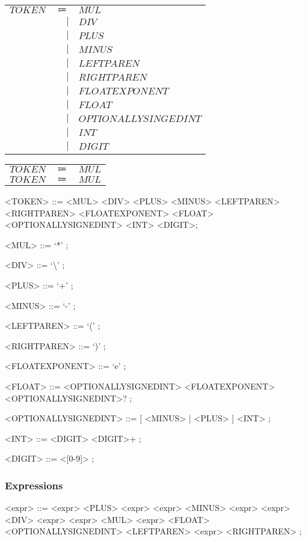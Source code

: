 \documentclass[a4paper,12pt]{article}
\begin{document}
{\setlength\tabcolsep{4pt}
\begin{tabular}{>{$}l<{$}>{$}r<{$}>{$}l<{$}}
  TOKEN &\Coloneqq &MUL\\%
  &| &DIV\\%
  &| &PLUS\\%
  &| &MINUS\\%
  &| &LEFTPAREN\\%
  &| &RIGHTPAREN\\%
  &| &FLOATEXPONENT\\%
  &| &FLOAT\\%
  &| &OPTIONALLYSINGEDINT\\%
  &| &INT\\%
  &| &DIGIT\\%
\end{tabular}}
\begin{grammar}

{\setlength\tabcolsep{4pt}
\begin{tabular}{>{$}l<{$}>{$}r<{$}>{$}l<{$}}
  TOKEN &\Coloneqq &MUL\\%
  TOKEN &\Coloneqq &MUL\\%
\end{tabular}}
<TOKEN> ::= <MUL> <DIV> <PLUS> <MINUS> <LEFTPAREN> <RIGHTPAREN> <FLOATEXPONENT> <FLOAT> <OPTIONALLYSIGNEDINT> <INT> <DIGIT>;

<MUL> ::= `*' ;

<DIV> ::= `\textbackslash' ;

<PLUS> ::= `+' ;

<MINUS> ::= `-' ;

<LEFTPAREN> ::= `(' ;

<RIGHTPAREN> ::= `)' ;

<FLOATEXPONENT> ::= `e' ;

<FLOAT> ::= <OPTIONALLYSIGNEDINT> <FLOATEXPONENT> <OPTIONALLYSIGNEDINT>? ;

<OPTIONALLYSIGNEDINT> ::= [ <MINUS> | <PLUS> ] <INT> ;

<INT> ::= <DIGIT> <DIGIT>+ ;

<DIGIT> ::= <[0-9]> ;


\end{grammar}
\subsubsection{Expressions}

\begin{grammar}
<expr> ::= <expr> <PLUS> <expr> 
 \alt <expr> <MINUS> <expr> 
 \alt <expr> <DIV> <expr> 
 \alt <expr> <MUL> <expr> 
 \alt <FLOAT> 
 \alt <OPTIONALLYSIGNEDINT> 
 \alt <LEFTPAREN> <expr> <RIGHTPAREN> ;
 

\end{grammar}
\end{document}
